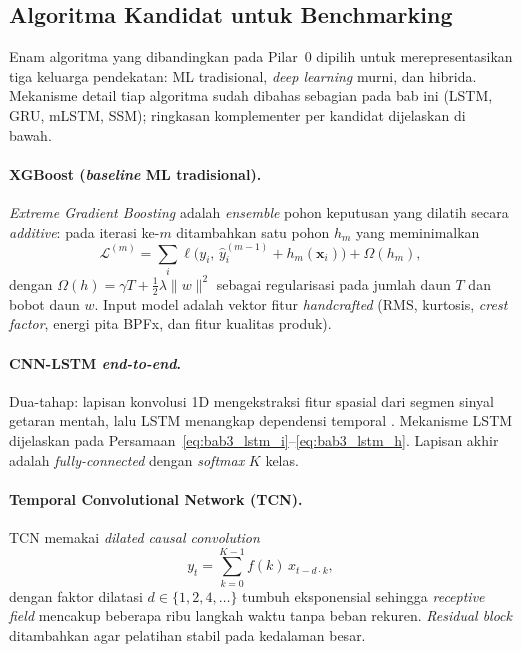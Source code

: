 \subsection{Algoritma Kandidat untuk Benchmarking}
\label{subsec:bab3_kls_kandidat}

Enam algoritma yang dibandingkan pada Pilar~0 dipilih untuk
merepresentasikan tiga keluarga pendekatan: ML tradisional,
\emph{deep learning} murni, dan hibrida. Mekanisme detail tiap
algoritma sudah dibahas sebagian pada bab ini (LSTM, GRU, mLSTM,
SSM); ringkasan komplementer per kandidat dijelaskan di bawah.

\paragraph{XGBoost (\emph{baseline} ML tradisional).}
\emph{Extreme Gradient Boosting} 
adalah \emph{ensemble} pohon keputusan yang dilatih secara
\emph{additive}: pada iterasi ke-$m$ ditambahkan satu pohon $h_m$ yang
meminimalkan
\begin{equation*}
  \mathcal{L}^{(m)} = \sum_i \ell\bigl(y_i,\, \hat{y}_i^{(m-1)} + h_m(\mathbf{x}_i)\bigr)
    + \Omega(h_m),
\end{equation*}
dengan $\Omega(h) = \gamma T + \tfrac{1}{2}\lambda\|w\|^2$ sebagai
regularisasi pada jumlah daun $T$ dan bobot daun $w$. Input model adalah
vektor fitur \emph{handcrafted} (RMS, kurtosis, \emph{crest factor},
energi pita BPFx, dan fitur kualitas produk).

\paragraph{CNN-LSTM \emph{end-to-end}.}
Dua-tahap: lapisan konvolusi 1D mengekstraksi fitur spasial dari
segmen sinyal getaran mentah, lalu LSTM menangkap dependensi temporal
. Mekanisme LSTM dijelaskan pada
Persamaan~\ref{eq:bab3_lstm_i}--\ref{eq:bab3_lstm_h}. Lapisan akhir adalah
\emph{fully-connected} dengan \emph{softmax} $K$ kelas.

\paragraph{Temporal Convolutional Network (TCN).}
TCN  memakai \emph{dilated causal convolution}
\begin{equation*}
  y_t = \sum_{k=0}^{K-1} f(k)\, x_{t - d \cdot k},
\end{equation*}
dengan faktor dilatasi $d \in \{1, 2, 4, \ldots\}$ tumbuh eksponensial
sehingga \emph{receptive field} mencakup beberapa ribu langkah waktu
tanpa beban rekuren. \emph{Residual block} ditambahkan agar pelatihan
stabil pada kedalaman besar.

